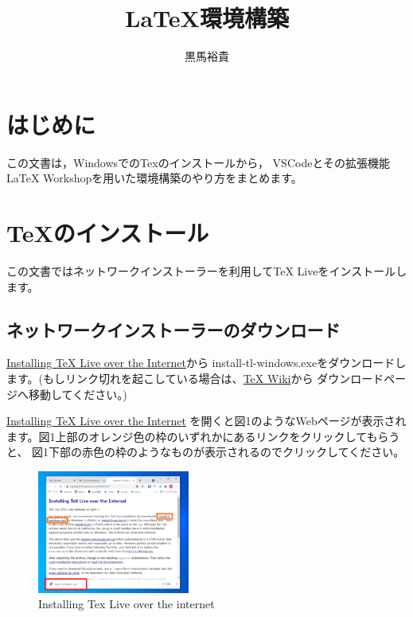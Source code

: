\documentclass[dvipdfmx]{jsarticle}
\begin{document}
\title{LaTeX環境構築}
\author{黒馬裕貴}
\maketitle

\section{はじめに}

この文書は，WindowsでのTexのインストールから，
VSCodeとその拡張機能LaTeX Workshopを用いた環境構築のやり方をまとめます。

\section{TeXのインストール}

この文書ではネットワークインストーラーを利用してTeX Liveをインストールします。

\subsection{ネットワークインストーラーのダウンロード}

\href{https://www.tug.org/texlive/acquire-netinstall.html}{Installing TeX Live over the Internet}から
install-tl-windows.exeをダウンロードします。(もしリンク切れを起こしている場合は、\href{https://texwiki.texjp.org/}{TeX Wiki}から
ダウンロードページへ移動してください。)

\href{https://www.tug.org/texlive/acquire-netinstall.html}{Installing TeX Live over the Internet}
を開くと図1のようなWebページが表示されます。図1上部のオレンジ色の枠のいずれかにあるリンクをクリックしてもらうと、
図1下部の赤色の枠のようなものが表示されるのでクリックしてください。

\begin{figure}[H]
    \begin{center}
    \includegraphics[width=5cm]{images/InstallingTexLiveOverTheInterner.png}
    \caption{Installing Tex Live over the internet}
    \end{center}
\end{figure}
\end{document}
